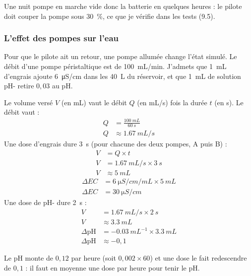 Une nuit pompe en marche vide donc la batterie en quelques heures : le pilote doit couper la pompe sous \qty{30}{\percent}, ce que je vérifie dans les tests (9.5).

\subsubsection*{L'effet des pompes sur l'eau}

Pour que le pilote ait un retour, une pompe allumée change l'état simulé. Le débit d'une pompe péristaltique est de \qty{100}{mL/min}. J'admets que \qty{1}{mL} d'engrais ajoute \qty{6}{\micro S/cm} dans les \qty{40}{L} du réservoir, et que \qty{1}{mL} de solution pH- retire $0{,}03$ au pH.

\begin{demonstration}
Le volume versé $V$ (en mL) vaut le débit $Q$ (en mL/s) fois la durée $t$ (en s). Le débit vaut :
\begin{align*}
Q &= \frac{\qty{100}{mL}}{\qty{60}{s}}\\
Q &\approx \qty{1,67}{mL/s}
\end{align*}
Une dose d'engrais dure \qty{3}{s} (pour chacune des deux pompes, A puis B) :
\begin{align*}
V &= Q\times t\\
V &= \qty{1,67}{mL/s}\times\qty{3}{s}\\
V &\approx \qty{5}{mL}
\end{align*}
\begin{align*}
\Delta EC &= \qty{6}{\micro S/cm/mL}\times\qty{5}{mL}\\
\Delta EC &= \qty{30}{\micro S/cm}
\end{align*}
Une dose de pH- dure \qty{2}{s} :
\begin{align*}
V &= \qty{1,67}{mL/s}\times\qty{2}{s}\\
V &\approx \qty{3,3}{mL}\\
\Delta\mathrm{pH} &= -\qty{0,03}{mL^{-1}}\times\qty{3,3}{mL}\\
\Delta\mathrm{pH} &\approx -0{,}1
\end{align*}
\end{demonstration}

Le pH monte de $0{,}12$ par heure (soit $0{,}002\times 60$) et une dose le fait redescendre de $0{,}1$ : il faut en moyenne une dose par heure pour tenir le pH.

